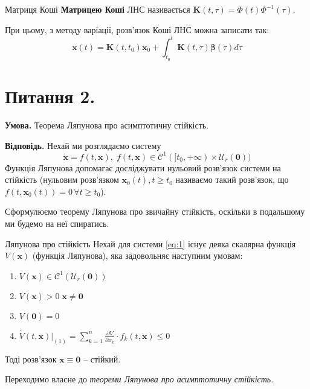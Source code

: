 \documentclass[14pt]{extarticle}
\begin{document}
\begin{def*}{Матриця Коші}
    \textbf{Матрицею Коші} ЛНС називається $\mathbf{K}(t,\tau)=\Phi(t)\Phi^{-1}(\tau)$. 
\end{def*}

При цьому, з методу варіації, розв'язок Коші ЛНС можна записати так:
\[
\mathbf{x}(t) = \mathbf{K}(t,t_0)\mathbf{x}_0 + \int_{t_0}^t \mathbf{K}(t,\tau)\boldsymbol{\beta}(\tau)d\tau
\]

\pagebreak

\section*{Питання 2.}

\textbf{Умова.} Теорема Ляпунова про асимптотичну стійкість.

\textbf{Відповідь.} Нехай ми розглядаємо систему
\begin{equation}\label{eq:1}
\dot{\mathbf{x}} = f(t,\mathbf{x}), \; f(t,\mathbf{x}) \in \mathcal{C}^1([t_0,+\infty) \times \mathcal{U}_r(\mathbf{0}))
\end{equation}
Функція Ляпунова допомагає досліджувати нульовий розв'язок системи на стійкість (нульовим розв'язком $\mathbf{x}_0(t), t \geq t_0$ називаємо такий розв'язок, що $f(t,\mathbf{x}_0(t))=0 \,\forall t \geq t_0$). 

Сформулюємо теорему Ляпунова про звичайну стійкість, оскільки в подальшому ми будемо на неї спиратись.

\begin{theorem*}{Ляпунова про стійкість}
    Нехай для системи \ref{eq:1} існує деяка скалярна функція $V(\mathbf{x})$ (функція Ляпунова), яка задовольняє наступним умовам:
    \begin{enumerate}
        \item $V(\mathbf{x}) \in \mathcal{C}^1(\mathcal{U}_r(\mathbf{0}))$
        \item $V(\mathbf{x}) > 0 \; \mathbf{x} \neq \mathbf{0}$
        \item $V(\mathbf{0}) = 0$
        \item $\dot{V}(t,\mathbf{x})\Big|_{(1)} = \sum_{k=1}^n \frac{\partial V}{\partial x_k} \cdot f_k(t,\dot{\mathbf{x}}) \leq 0$
    \end{enumerate}
    Тоді розв'язок $\mathbf{x} \equiv \mathbf{0}$ -- стійкий.
\end{theorem*}

Переходимо власне до \textit{теореми Ляпунова про асимптотичну стійкість}.
\end{document}
